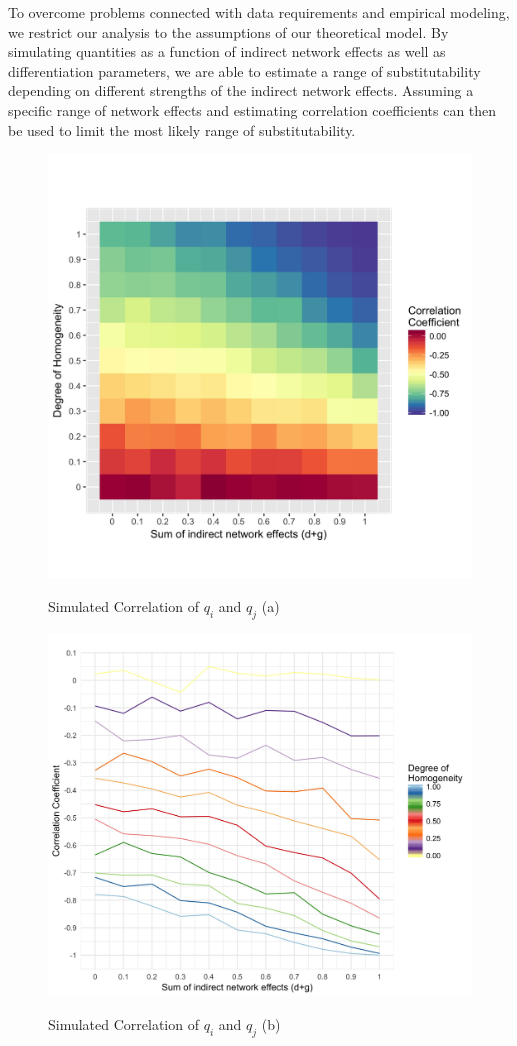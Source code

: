 \documentclass[12pt,a4paper,notitlepage]{article}
\begin{document}
To overcome problems connected with data requirements and empirical modeling, we restrict our analysis to the assumptions of our theoretical model. By simulating quantities as a function of indirect network effects as well as differentiation parameters, we are able to estimate a range of substitutability depending on different strengths of the indirect network effects. Assuming a specific range of network effects and estimating correlation coefficients can then be used to limit the most likely range of substitutability.  

\begin{figure}[H]
	\centering
	\caption{Simulated Correlation of $q_i$ and $q_j$ (a)}
	\includegraphics[width=.7\textwidth]{../figs/qqmatrix}
	\label{fig_QQa}
\end{figure}

\begin{figure}[H]
	\centering
	\caption{Simulated Correlation of $q_i$ and $q_j$ (b)}
	\includegraphics[width=.7\textwidth]{../figs/qqplot}
	\label{fig_QQb}
\end{figure}
\end{document}
